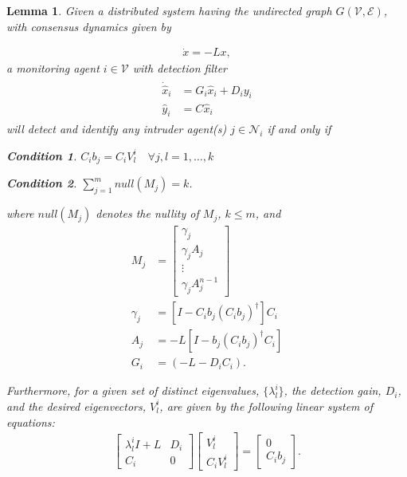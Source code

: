 \documentclass{amsart}
\newtheorem{lemma}{Lemma}
\theoremstyle{definition}
\newtheorem{cond}{Condition}
\theoremstyle{remark}
\numberwithin{equation}{section}
\begin{document}
\begin{lemma} \label{lem:distributedDetection}
Given a distributed system having the undirected graph $G(\mathcal{V},\mathcal{E})$, with consensus dynamics given by

\begin{align} \label{eq:conDyn}
\dot{x} = -Lx,
\end{align}
a monitoring agent $i \in \mathcal{V}$ with detection filter
\begin{gather}\label{eq:detFilter}
\begin{aligned} 
\dot{\hat{x}}_i&=G_i\hat{x}_i + D_i y_i \\
\hat{y}_i &= C\hat{x}_i
\end{aligned}
\end{gather}
will detect and identify any intruder agent(s) $j \in \mathcal{N}_i$ if and only if
\begin{cond} \label{num:cond1}
$C_i b_j = C_i V_l^i \quad \forall j,l = 1,\ldots,k \quad$  
\end{cond}
\begin{cond} \label{num:cond2}
$\sum_{j=1}^m null(M_j) = k$.
\end{cond}
\noindent where $null(M_j)$ denotes the nullity of $M_j$, $k \leq m$, and 
\begin{align}
M_j &= \left [ \begin{array}{c} \gamma_j \\ \gamma_j A_j \\ \vdots \\ \gamma_j A_{j}^{n-1} \end{array} \right ] \label{eq:eq3}\\
\gamma_j &= \left [ I - C_i b_j (C_i b_j)^{\dagger}\right]C_i \label{eq:eq4}\\
A_j &= -L\left [I - b_j(C_ib_j)^{\dagger}C_i\right ] \label{eq:eq5}\\ 
G_i &= (-L-D_iC_i). \nonumber
\end{align}

\noindent Furthermore, for a given set of distinct eigenvalues, $\{ \lambda_l^i \}$, the detection gain, $D_i$, and the desired eigenvectors, $V_l^i$, are given by the following linear system of equations:
\begin{align} \label{eq:linSystem}
\left [ \begin{array}{cc} \lambda_l^i I + L & D_i \\ C_i & 0 \end{array} \right ]\left [ \begin{array}{c} V_l^i \\ C_i V_l^i \end{array}\right] = \left [ \begin{array}{c} 0 \\ C_i b_j \end{array} \right ].
\end{align}
\end{lemma}
\end{document}
